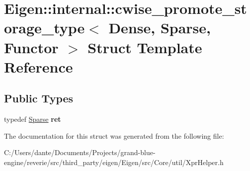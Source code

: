 \hypertarget{struct_eigen_1_1internal_1_1cwise__promote__storage__type_3_01_dense_00_01_sparse_00_01_functor_01_4}{}\section{Eigen\+::internal\+::cwise\+\_\+promote\+\_\+storage\+\_\+type$<$ Dense, Sparse, Functor $>$ Struct Template Reference}
\label{struct_eigen_1_1internal_1_1cwise__promote__storage__type_3_01_dense_00_01_sparse_00_01_functor_01_4}
\subsection*{Public Types}
\begin{DoxyCompactItemize}
\item 
\mbox{\label{struct_eigen_1_1internal_1_1cwise__promote__storage__type_3_01_dense_00_01_sparse_00_01_functor_01_4_a6d5d30a5bdac5999c76a2e694e4b2ad3}} 
typedef \mbox{\hyperlink{struct_eigen_1_1_sparse}{Sparse}} {\bfseries ret}
\end{DoxyCompactItemize}


The documentation for this struct was generated from the following file\+:\begin{DoxyCompactItemize}
\item 
C\+:/\+Users/dante/\+Documents/\+Projects/grand-\/blue-\/engine/reverie/src/third\+\_\+party/eigen/\+Eigen/src/\+Core/util/Xpr\+Helper.\+h\end{DoxyCompactItemize}

